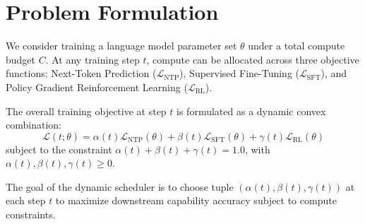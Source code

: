 \section{Problem Formulation}
\label{sec:formulation}

We consider training a language model parameter set $\theta$ under a total compute budget $C$. At any training step $t$, compute can be allocated across three objective functions: Next-Token Prediction ($\mathcal{L}_{\text{NTP}}$), Supervised Fine-Tuning ($\mathcal{L}_{\text{SFT}}$), and Policy Gradient Reinforcement Learning ($\mathcal{L}_{\text{RL}}$).

The overall training objective at step $t$ is formulated as a dynamic convex combination:
\begin{equation}
    \mathcal{L}(t; \theta) = \alpha(t) \mathcal{L}_{\text{NTP}}(\theta) + \beta(t) \mathcal{L}_{\text{SFT}}(\theta) + \gamma(t) \mathcal{L}_{\text{RL}}(\theta)
\end{equation}
subject to the constraint $\alpha(t) + \beta(t) + \gamma(t) = 1.0$, with $\alpha(t), \beta(t), \gamma(t) \ge 0$.

The goal of the dynamic scheduler is to choose tuple $(\alpha(t), \beta(t), \gamma(t))$ at each step $t$ to maximize downstream capability accuracy subject to compute constraints.
